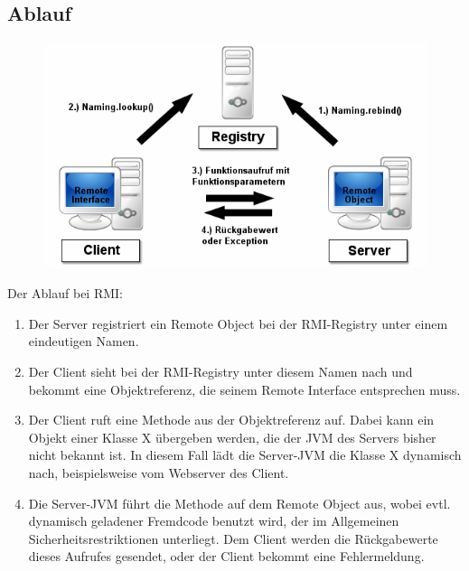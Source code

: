\documentclass[10pt]{article}
\begin{document}
\subsection{Ablauf}
\begin{figure}
	\centering
	\includegraphics[scale=0.35]{images/rmi-schema.png}%
\end{figure}
Der Ablauf bei RMI:
\begin{enumerate}
	\item Der Server registriert ein Remote Object bei der RMI-Registry unter einem eindeutigen Namen.
	\item Der Client sieht bei der RMI-Registry unter diesem Namen nach und bekommt eine Objektreferenz, die seinem Remote Interface entsprechen muss.
	\item Der Client ruft eine Methode aus der Objektreferenz auf. Dabei kann ein Objekt einer Klasse X übergeben werden, die der JVM des Servers bisher nicht bekannt ist. In diesem Fall lädt die Server-JVM die Klasse X dynamisch nach, beispielsweise vom Webserver des Client.
	\item Die Server-JVM führt die Methode auf dem Remote Object aus, wobei evtl. dynamisch geladener Fremdcode benutzt wird, der im Allgemeinen Sicherheitsrestriktionen unterliegt. Dem Client werden die Rückgabewerte dieses Aufrufes gesendet, oder der Client bekommt eine Fehlermeldung.
\end{enumerate}
\end{document}
